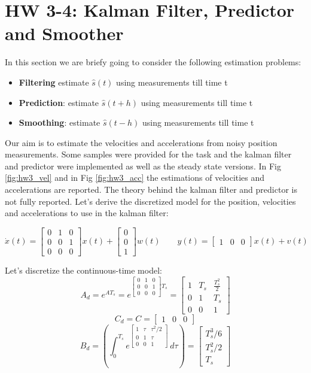 \documentclass[a4paper,12pt]{article}
\begin{document}
\section{HW 3-4: Kalman Filter, Predictor and Smoother}
In this section we are briefy going to consider the following estimation problems:
\begin{itemize}
    \item \textbf{Filtering} estimate $\hat{s}(t)$ using measurements till time t
    \item \textbf{Prediction}: estimate $\hat{s}(t+h)$ using measurements till time t
    \item \textbf{Smoothing}: estimate $\hat{s}(t-h)$ using measurements till time t
\end{itemize}
\bigskip

Our aim is to estimate the velocities and accelerations from noisy position measurements. Some samples were provided for the task and the kalman filter and predictor were implemented as well as the steady state versions. In Fig \ref{fig:hw3_vel} and in Fig \ref{fig:hw3_acc} the estimations of velocities and accelerations are reported. The theory behind the kalman filter and predictor is not fully reported. Let's derive the discretized model for the position, velocities and accelerations to use in the kalman filter:

\begin{equation}
    \dot{x}(t) =  \begin{bmatrix}  0&1&0 \\ 0&0&1\\0&0&0 \end{bmatrix} x(t) + \begin{bmatrix}  0\\0\\1 \end{bmatrix} w(t)
    \qquad
    y(t) = \begin{bmatrix}  1&0&0 \end{bmatrix}x(t) + v(t)
\end{equation}

\noindent Let's discretize the continuous-time model:
\[
    A_d = e^{AT_s} = e^{\begin{bmatrix}  0&1&0 \\ 0&0&1\\0&0&0 \end{bmatrix}T_s} = \begin{bmatrix} 1&T_s&\frac{T_s^2}{2}\\0&1&T_s\\0&0&1 \end{bmatrix}
\]
\[
    C_d = C = \begin{bmatrix} 1&0&0 \end{bmatrix}
\]
\[
    B_d = \left (\int_{0}^{T_s} e^{\begin{bmatrix} 1&\tau&\tau^2/2\\0&1&\tau\\0&0&1 \end{bmatrix}} \,d\tau \right) = \begin{bmatrix} T_s^3/6\\T_s^2/2\\T_s \end{bmatrix}
\]
\end{document}
